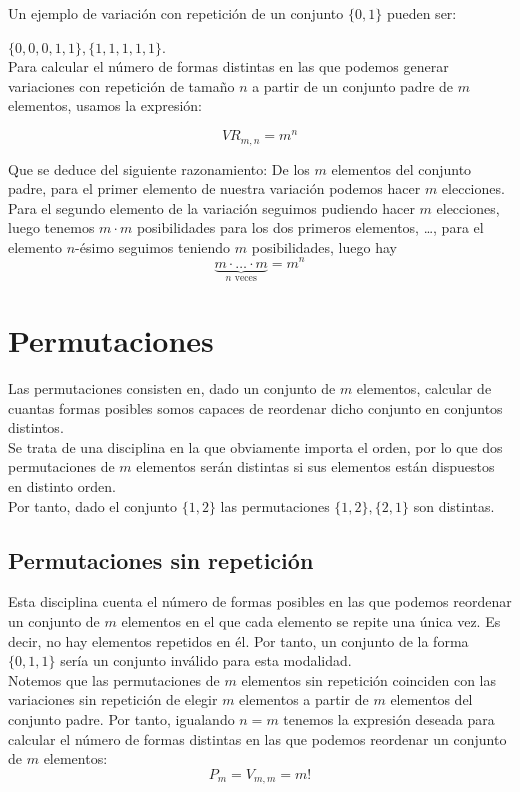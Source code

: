 Un ejemplo de variación con repetición de un conjunto $\{0, 1\}$ pueden ser:

$\{0, 0, 0, 1, 1\},
  \{1, 1, 1, 1, 1\}$.\\


Para calcular el número de formas distintas en las que podemos generar variaciones con repetición de tamaño
$n$ a partir de un conjunto padre de $m$ elementos, usamos la expresión:

$$VR_{m, n} = m^n$$


Que se deduce del siguiente razonamiento: De los $m$ elementos del conjunto padre, para el primer elemento
de nuestra variación podemos hacer $m$ elecciones. Para el segundo elemento de la variación seguimos
pudiendo hacer $m$ elecciones, luego tenemos $m \cdot m$ posibilidades para los dos primeros elementos, \ldots,
para el elemento $n$-ésimo seguimos teniendo $m$ posibilidades, luego hay
$$\underbrace{m\cdot \ldots\cdot m}_{\mbox{$n$ veces}}= m^n$$

\section{Permutaciones}

Las permutaciones consisten en, dado un conjunto de $m$ elementos, calcular de cuantas formas posibles
somos capaces de reordenar dicho conjunto en conjuntos distintos.\\


Se trata de una disciplina en la que obviamente importa el orden, por lo que dos permutaciones de $m$
elementos serán distintas si sus elementos están dispuestos en distinto orden.\\


Por tanto, dado el conjunto $\{1, 2\}$ las permutaciones $\{1, 2\}, \{2, 1\}$ son distintas.

\subsection{Permutaciones sin repetición}

Esta disciplina cuenta el número de formas posibles en las que podemos reordenar un conjunto de $m$ elementos
en el que cada elemento se repite una única vez. Es decir, no hay elementos repetidos en él. Por tanto, un
conjunto de la forma $\{0, 1, 1\}$ sería un conjunto inválido para esta modalidad.\\


Notemos que las permutaciones de $m$ elementos sin repetición coinciden con las variaciones sin repetición
de elegir $m$ elementos a partir de $m$ elementos del conjunto padre. Por tanto, igualando $n=m$ tenemos
la expresión deseada para calcular el número de formas distintas en las que podemos reordenar un conjunto
de $m$ elementos:
$$P_m = V_{m, m} = m!$$


